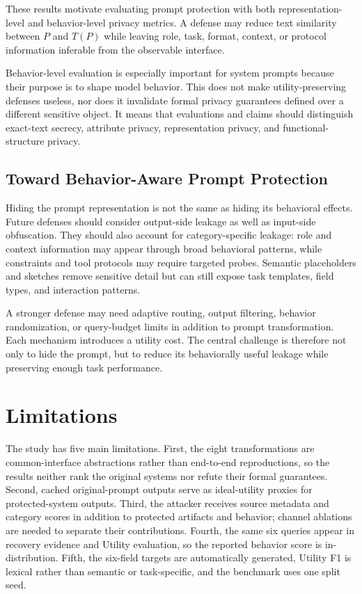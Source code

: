 \documentclass[letterpaper]{article} %
\begin{document}
These results motivate evaluating prompt protection with both representation-level and behavior-level privacy metrics.  A defense may reduce text similarity between \(P\) and \(T(P)\) while leaving role, task, format, context, or protocol information inferable from the observable interface.

Behavior-level evaluation is especially important for system prompts because their purpose is to shape model behavior.  This does not make utility-preserving defenses useless, nor does it invalidate formal privacy guarantees defined over a different sensitive object.  It means that evaluations and claims should distinguish exact-text secrecy, attribute privacy, representation privacy, and functional-structure privacy.

\subsection{Toward Behavior-Aware Prompt Protection}

Hiding the prompt representation is not the same as hiding its behavioral effects.  Future defenses should consider output-side leakage as well as input-side obfuscation.  They should also account for category-specific leakage: role and context information may appear through broad behavioral patterns, while constraints and tool protocols may require targeted probes.  Semantic placeholders and sketches remove sensitive detail but can still expose task templates, field types, and interaction patterns.

A stronger defense may need adaptive routing, output filtering, behavior randomization, or query-budget limits in addition to prompt transformation.  Each mechanism introduces a utility cost.  The central challenge is therefore not only to hide the prompt, but to reduce its behaviorally useful leakage while preserving enough task performance.

\section{Limitations}

The study has five main limitations.  First, the eight transformations are common-interface abstractions rather than end-to-end reproductions, so the results neither rank the original systems nor refute their formal guarantees.  Second, cached original-prompt outputs serve as ideal-utility proxies for protected-system outputs.  Third, the attacker receives source metadata and category scores in addition to protected artifacts and behavior; channel ablations are needed to separate their contributions.  Fourth, the same six queries appear in recovery evidence and Utility evaluation, so the reported behavior score is in-distribution.  Fifth, the six-field targets are automatically generated, Utility F1 is lexical rather than semantic or task-specific, and the benchmark uses one split seed.
\end{document}
